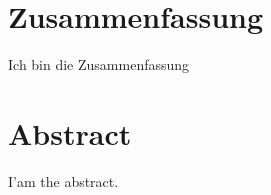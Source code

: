 \cleardoublepage

\chapter*{Zusammenfassung}
Ich bin die Zusammenfassung


\newpage
\chapter*{Abstract}
I'am the abstract.